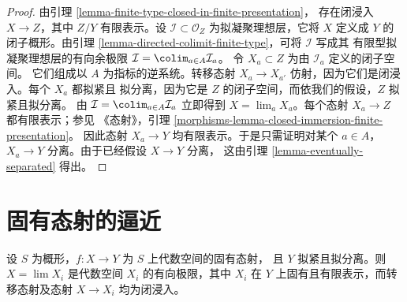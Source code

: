 \begin{proof}
由引理 \ref{lemma-finite-type-closed-in-finite-presentation}，
存在闭浸入 $X \to Z$，其中 $Z/Y$ 有限表示。设
$\mathcal{I} \subset \mathcal{O}_Z$ 为拟凝聚理想层，它将
$X$ 定义成 $Y$ 的闭子概形。由引理
\ref{lemma-directed-colimit-finite-type}，可将 $\mathcal{I}$ 写成其
有限型拟凝聚理想层的有向余极限
$\mathcal{I} = \colim_{a \in A} \mathcal{I}_a$。
令 $X_a \subset Z$ 为由 $\mathcal{I}_a$ 定义的闭子空间。
它们组成以 $A$ 为指标的逆系统。转移态射
$X_a \to X_{a'}$ 仿射，因为它们是闭浸入。每个 $X_a$ 都拟紧且
拟分离，因为它是 $Z$ 的闭子空间，而依我们的假设，$Z$ 拟紧且拟分离。
由 $\mathcal{I} = \colim_{a \in A} \mathcal{I}_a$ 立即得到
$X = \lim_a X_a$。每个态射 $X_a \to Z$ 都有限表示；参见
《态射》，引理 \ref{morphisms-lemma-closed-immersion-finite-presentation}。
因此态射 $X_a \to Y$ 均有限表示。于是只需证明对某个
$a \in A$，$X_a \to Y$ 分离。由于已经假设 $X \to Y$ 分离，
这由引理 \ref{lemma-eventually-separated} 得出。
\end{proof}






\section{固有态射的逼近}
\label{section-approximate-proper}

\begin{lemma}
\label{lemma-proper-limit-of-proper-finite-presentation}
设 $S$ 为概形，$f : X \to Y$ 为 $S$ 上代数空间的固有态射，
且 $Y$ 拟紧且拟分离。则 $X = \lim X_i$ 是代数空间 $X_i$
的有向极限，其中 $X_i$ 在 $Y$ 上固有且有限表示，而转移态射及态射
$X \to X_i$ 均为闭浸入。
\end{lemma}

